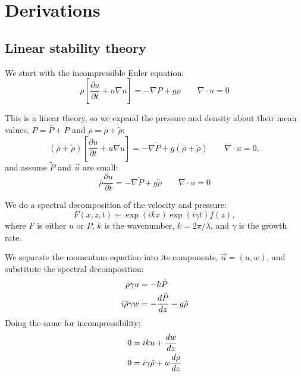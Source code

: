 \chapter{Derivations}

\section{Linear stability theory} 
We start with the incompressible Euler equation:
\begin{equation}
	\rho \left[ \frac{\partial u}{\partial t} + u \nabla u\right] = -\nabla P + g \rho \qquad \nabla \cdot u = 0 
\end{equation}

This is a linear theory, so we expand the pressure and density about their mean values, $P = \bar{P} + \tilde{P}$ and $\rho = \bar\rho + \tilde\rho$:
\begin{equation}
(\bar\rho +\tilde \rho) \left[ \frac{\partial u}{\partial t} + u \nabla u\right] = -\nabla \tilde{P} + g (\bar\rho+\tilde\rho) \qquad \nabla \cdot u = 0,
\end{equation}
and assume $\tilde{P}$ and $\vec{u}$ are small:
\begin{equation}
\bar\rho \frac{\partial u}{\partial t} = -\nabla \tilde{P} + g \tilde\rho \qquad \nabla \cdot u = 0
\end{equation}

We do a spectral decomposition of the velocity and pressure:
\begin{equation}
F(x,z,t) \sim \exp(i k x) \exp(i \gamma t) f(z),
\end{equation}
where $F$ is either $u$ or $P$, $k$ is the wavenumber, $k = 2 \pi / \lambda$, and $\gamma$ is the growth rate.

We separate the momentum equation into its components, $\vec{u} = (u,w)$, and substitute the spectral decomposition:
\begin{align}
	\bar\rho \gamma u &= - k \tilde{P} \elabel{span_p} \\
	i \bar\rho \gamma w &= - \frac{d\tilde{P}}{dz} - g \tilde\rho \elabel{virt_p}
\end{align}
Doing the same for incompressibility:
\begin{align}
	0 &= i k u + \frac{dw}{dz} \elabel{span_r} \\
	0 &= i \gamma \tilde\rho + w \frac{d\bar\rho}{dz} \elabel{virt_r}
\end{align}

